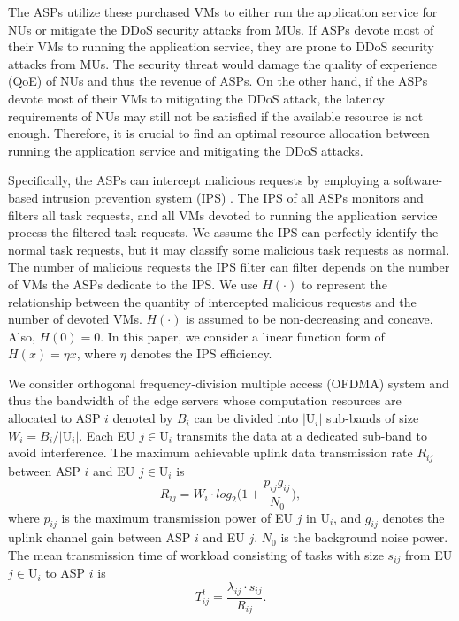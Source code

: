 \documentclass[conference]{IEEEtran}
\begin{document}
The ASPs utilize these purchased VMs to either run the application service for NUs or mitigate the DDoS security attacks from MUs. If ASPs devote most of their VMs to running the application service, they are prone to DDoS security attacks from MUs. The security threat would damage the quality of experience (QoE) of NUs and thus the revenue of ASPs. On the other hand, if the ASPs devote most of their VMs to mitigating the DDoS attack, the latency requirements of NUs may still not be satisfied if the available resource is not enough. Therefore, it is crucial to find an optimal resource allocation between running the application service and mitigating the DDoS attacks. 

Specifically, the ASPs can intercept malicious requests by employing a software-based intrusion prevention system (IPS) \cite{Suricata}. The IPS of all ASPs monitors and filters all task requests, and all VMs devoted to running the application service process the filtered task requests. We assume the IPS can perfectly identify the normal task requests, but it may classify some malicious task requests as normal. The number of malicious requests the IPS filter can filter depends on the number of VMs the ASPs dedicate to the IPS. We use $H(\cdot)$ to represent the relationship between the quantity of intercepted malicious requests and the number of devoted VMs. $H(\cdot)$ is assumed to be non-decreasing and concave. Also, $H(0)=0$. In this paper, we consider a linear function form of $H(x) = \eta{x}$, where $\eta$ denotes the IPS efficiency. %

We consider orthogonal frequency-division multiple access (OFDMA) system and thus the bandwidth of the edge servers whose computation resources are allocated to ASP $i$ denoted by $B_i$ can be divided into $|\mathrm{U}_i|$ sub-bands of size $W_{i} = B_i/|\mathrm{U}_i|$. Each EU $j\in \mathrm{U}_i$ transmits the data at a dedicated sub-band to avoid interference. The maximum achievable uplink data transmission rate $R_{ij}$ between ASP $i$ and EU $j \in \mathrm{U}_i$ is
\begin{equation} \label{eqn:shannon}
R_{ij}=W_i \cdot log_2\Big(1+\frac{p_{ij}g_{ij}}{N_{0}}\Big),
\end{equation}
where $p_{ij}$ is the maximum transmission power of EU $j$ in $\mathrm{U}_i$, and $g_{ij}$ denotes the uplink channel gain between ASP $i$ and EU $j$. $N_0$ is the background noise power. The mean transmission time of workload consisting of tasks with size $s_{ij}$ from EU $j \in \mathrm{U}_i$ to ASP $i$ is
\begin{equation}
T_{ij}^t=\frac{\lambda_{ij} \cdot s_{ij}}{R_{ij}}.
\end{equation}
\end{document}

